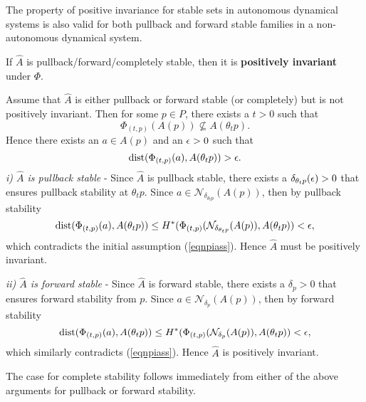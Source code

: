 The property of positive invariance for stable sets in autonomous dynamical
systems is also valid for both pullback and forward stable families in a
non-autonomous dynamical system.

\begin{therm}\label{thmstabtopi}
If $\hat{A}$ is pullback/forward/completely stable, then it is {\bf positively
invariant} under $\Phi$.
\end{therm}
\begin{prf}
Assume that $\hat{A}$ is either pullback or forward stable (or completely) but
is not positively invariant.  Then for some $p \in P$, there exists a $t > 0$
such that
\[ \Phi_{(t, p)}(A(p)) \nsubseteq A(\theta_{t}p). \]
Hence there exists an $a \in A(p)$ and an $\epsilon > 0$ such that
\begin{equation}\label{eqnpiass}
 {\rm dist}( \Phi_{(t, p)}(a), A(\theta_{t}p)) > \epsilon.
\end{equation}
\textit{i) $\hat{A}$ is pullback stable} - Since $\hat{A}$ is pullback stable,
there exists a $\delta_{\theta_t p}(\epsilon) > 0$ that ensures pullback stability
at $\theta_{t}p$. Since $a \in \mathcal{N}_{\delta_{\theta_t p}}(A(p))$, then by
pullback stability
\[ {\rm dist}( \Phi_{(t, p)}(a), A(\theta_t p)) \leq H^*(\Phi_{(t,
          p)}(\mathcal{N}_{\delta_{\theta_t p}} (A(p)), A(\theta_t p)) < \epsilon, \]
which contradicts the initial assumption (\ref{eqnpiass}). Hence $\hat{A}$ must
be positively invariant.

\textit{ii) $\hat{A}$ is forward stable} - Since $\hat{A}$ is forward stable,
there exists a $\delta_p > 0$ that ensures forward stability from $p$. Since $a
\in \mathcal{N}_{\delta_p}(A(p))$, then by forward stability
\[ {\rm dist}( \Phi_{(t, p)}(a), A(\theta_t p)) \leq H^*(\Phi_{(t,
          p)}(\mathcal{N}_{\delta_p} (A(p)), A(\theta_t p)) < \epsilon, \]
which similarly contradicts (\ref{eqnpiass}). Hence $\hat{A}$ is positively
invariant.

The case for complete stability follows immediately from either of the above
arguments for pullback or forward stability.
\end{prf}

